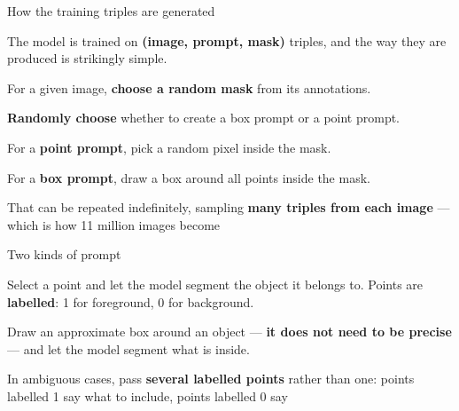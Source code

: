 \documentclass[aspectratio=169,11pt,t]{beamer}
\begin{document}
\begin{frame}[shrink=25]{How the training triples are generated}
{\fontsize{9.4}{12.6}\selectfont\color{fg2}The model is trained on \textbf{(image, prompt, mask)} triples, and the way they are produced is strikingly simple.\par}\vskip 4pt
\begin{isteps}
\item For a given image, \textbf{choose a random mask} from its annotations.
\item \textbf{Randomly choose} whether to create a box prompt or a point prompt.
\item For a \textbf{point prompt}, pick a random pixel inside the mask.
\item For a \textbf{box prompt}, draw a box around all points inside the mask.
\end{isteps}
\begin{iband}[signal]
That can be repeated indefinitely, sampling \textbf{many triples from each image} --- which is how 11 million images become 
\end{iband}
\end{frame}

\begin{frame}[shrink=25]{Two kinds of prompt}
\begin{minipage}[t]{0.494\textwidth}
\begin{icardaccent}
Select a point and let the model segment the object it belongs to. Points are \textbf{labelled}: 1 for foreground, 0 for background.
\end{icardaccent}
\end{minipage}%
\hfill
\begin{minipage}[t]{0.494\textwidth}
\begin{icardaccent}
Draw an approximate box around an object --- \textbf{it does not need to be precise} --- and let the model segment what is inside.
\end{icardaccent}
\end{minipage}%
\begin{iband}[signal]
In ambiguous cases, pass \textbf{several labelled points} rather than one: points labelled 1 say what to include, points labelled 0 say 
\end{iband}
\end{frame}
\end{document}
